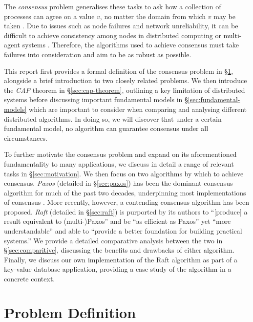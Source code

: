 \documentclass[12pt, a4paper]{article}
\begin{document}
The \textit{consensus} problem generalises these tasks to ask how a collection of processes can agree on a value $v$, no matter the domain from which $v$ may be taken \cite{coulouris2005distributed}. Due to issues such as node failures and network unreliability, it can be difficult to achieve consistency among nodes in distributed computing or multi-agent systems \cite{coulouris2005distributed}. Therefore, the algorithms used to achieve consensus must take failures into consideration and aim to be as robust as possible.

This report first provides a formal definition of the consensus problem in \S\ref{sec:consensus-def}, alongside a brief introduction to two closely related problems. We then introduce the \textit{CAP} theorem in \S\ref{sec:cap-theorem}, outlining a key limitation of distributed systems before discussing important fundamental models in \S\ref{sec:fundamental-models} which are important to consider when comparing and analysing different distributed algorithms. In doing so, we will discover that under a certain fundamental model, no algorithm can guarantee consensus under all circumstances.

To further motivate the consensus problem and expand on its aforementioned fundamentality to many applications, we discuss in detail a range of relevant tasks in \S\ref{sec:motivation}. We then focus on two algorithms by which to achieve consensus. \textit{Paxos} \cite{lamport1998part, lamport2001paxos} (detailed in \S\ref{sec:paxos}) has been the dominant consensus algorithm for much of the past two decades, underpinning most implementations of consensus \cite{ongaro2014search}. More recently, however, a contending consensus algorithm has been proposed. \textit{Raft} \cite{ongaro2014search} (detailed in \S\ref{sec:raft}) is purported by its authors to ``[produce] a result equivalent to (multi-)Paxos'' and be ``as efficient as Paxos'' yet ``more understandable'' and able to ``provide a better foundation for building practical systems.'' \cite{ongaro2014search} We provide a detailed comparative analysis between the two in \S\ref{sec:comparitive}, discussing the benefits and drawbacks of either algorithm. Finally, we discuss our own implementation of the Raft algorithm as part of a key-value database
application, providing a case study of the algorithm in a concrete context.


\section{Problem Definition} \label{sec:consensus-def}
\end{document}
